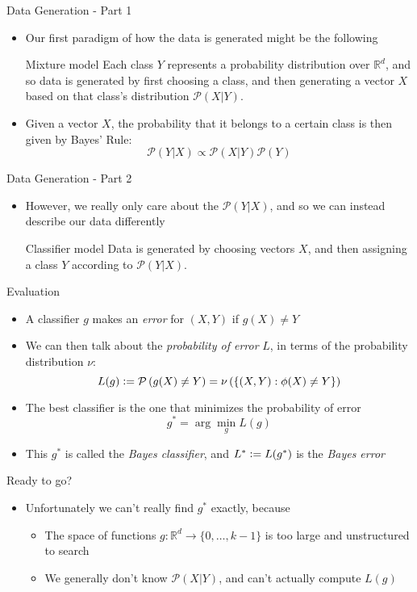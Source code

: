 \documentclass{beamer}
\renewcommand{\Pr}[1]{\mathcal{P} \left( #1 \right)}
\newcommand{\R}{\mathbb{R}}
\newcommand{\defeq}{\vcentcolon=}
\newcommand{\pa}[1]{\left( #1 \right)}
\newcommand{\br}[1]{\left\{ #1 \right\} }
\begin{document}
\begin{frame}{Data Generation - Part 1}
\begin{itemize}
\item Our first paradigm of how the data is generated might be the following
\begin{block}{Mixture model}
Each class $Y$ represents a probability distribution over $\R^d$, and so data is generated by first choosing a class, and then generating a vector $X$ based on that class's distribution $\Pr{X|Y}$.\\
\end{block}
\item Given a vector $X$, the probability that it belongs to a certain class is then given by Bayes' Rule:
\[ \Pr{Y|X} \propto \Pr{X|Y} \Pr{Y} \]
\end{itemize}
\end{frame}

\begin{frame}{Data Generation - Part 2}
\begin{itemize}
\item However, we really only care about the $\Pr{Y|X}$, and so we can instead describe our data differently
\begin{block}{Classifier model}
Data is generated by choosing vectors $X$, and then assigning a class $Y$ according to $\Pr{Y|X}$. 
\end{block}
\end{itemize}
\end{frame}

\begin{frame}{Evaluation}
\begin{itemize}
\item A classifier $g$ makes an \emph{error} for $(X,Y)$ if $g(X) \ne Y$
\item We can then talk about the \emph{probability of error} $L$, in terms of the probability distribution $\nu$:
\[ L(g) \defeq \Pr{g(X) \ne Y} = \nu\pa{ \br{ (X,Y) : \phi(X) \ne Y}}  \]
\item The best classifier is the one that minimizes the probability of error
\[ g^* = \arg \min_g L(g) \]
\item This $g^*$ is called the \emph{Bayes classifier}, and $L^* \defeq L(g^*)$ is the \emph{Bayes error}
\end{itemize}
\end{frame}

\begin{frame}{Ready to go?}
\begin{itemize}
\item Unfortunately we can't really find $g^*$ exactly, because
\begin{itemize}
\item The space of functions $g: \R^d \to \{0,\ldots,k-1\}$ is too large and unstructured to search
\item We generally don't know $\Pr{X|Y}$, and can't actually compute $L(g)$
\end{itemize}
\end{itemize}
\end{frame}
\end{document}
